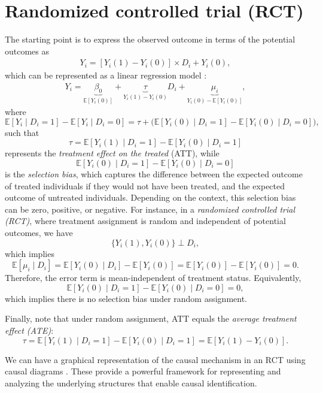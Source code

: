\section{Randomized controlled trial (RCT)}

The starting point is to express the observed outcome in terms of the potential outcomes as
\begin{align*}
	Y_i = [Y_i(1) - Y_i(0)] \times D_i + Y_i(0),
\end{align*}
which can be represented as a linear regression model \cite{angrist2009mostly}:
\begin{align*}
	Y_i = \underbrace{\beta_0}_{\mathbb{E}[Y_i(0)]} 
	+ \underbrace{\tau}_{Y_i(1)-Y_i(0)} D_i 
	+ \underbrace{\mu_i}_{Y_i(0)-\mathbb{E}[Y_i(0)]},
\end{align*}
where
\[
\mathbb{E}[Y_i \mid D_i=1] - \mathbb{E}[Y_i \mid D_i=0] 
= \tau + \big( \mathbb{E}[Y_i(0) \mid D_i=1] - \mathbb{E}[Y_i(0) \mid D_i=0] \big),
\]
such that 
\[\tau=\mathbb{E}[Y_i(1)\mid D_i=1]-\mathbb{E}[Y_i(0)\mid D_i=1]
\] represents the \textit{treatment effect on the treated} (ATT), while
\[
\mathbb{E}[Y_i(0) \mid D_i=1] - \mathbb{E}[Y_i(0) \mid D_i=0]
\]
is the \textit{selection bias}, which captures the difference between the expected outcome of treated individuals if they would not have been treated, and the expected outcome of untreated individuals. Depending on the context, this selection bias can be zero, positive, or negative. For instance, in a \textit{randomized controlled trial (RCT)}, where treatment assignment is random and independent of potential outcomes, we have
\[
\{ Y_i(1), Y_i(0) \} \perp D_i,
\]
which implies
\[
\mathbb{E}[\mu_i \mid D_i] = \mathbb{E}[Y_i(0) \mid D_i] - \mathbb{E}[Y_i(0)] = \mathbb{E}[Y_i(0)] - \mathbb{E}[Y_i(0)] = 0.
\]
Therefore, the error term is mean-independent of treatment status. Equivalently,
\[
\mathbb{E}[Y_i(0) \mid D_i = 1] - \mathbb{E}[Y_i(0) \mid D_i = 0] = 0,
\]
which implies there is no selection bias under random assignment.

Finally, note that under random assignment, ATT equals the \textit{average treatment effect (ATE)}:
\[\tau=\mathbb{E}[Y_i(1)\mid D_i=1]-\mathbb{E}[Y_i(0)\mid D_i=1]=\mathbb{E}[Y_i(1)-Y_i(0)].
\]

We can have a graphical representation of the causal mechanism in an RCT using causal diagrams \cite{pearl1995causal,pearl2018book}. These provide a powerful framework for representing and analyzing the underlying structures that enable causal identification.

